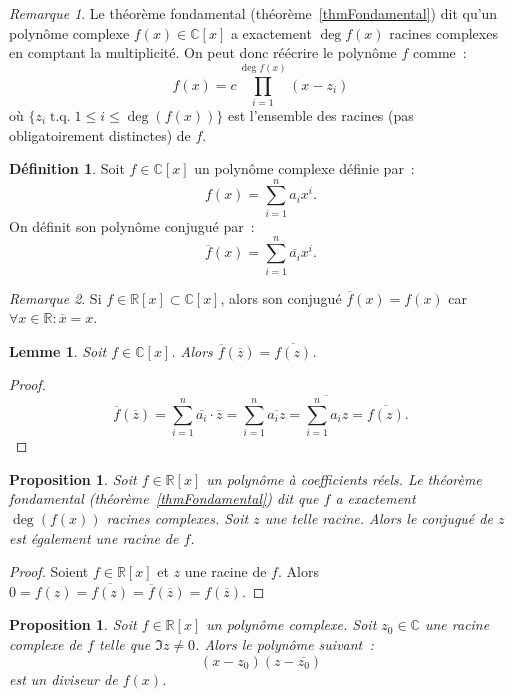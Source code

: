 \documentclass{article}
\DeclareMathOperator{\tq}{\text{ t.q. }}
\newcommand{\R}{\mathbb R}
\newcommand{\C}{\mathbb C}
\newtheorem{prp}[thm]{Proposition}
\newtheorem{lem}[thm]{Lemme}
\theoremstyle{definition}
\newtheorem{déf}[thm]{Définition}
\theoremstyle{remark}
\newtheorem*{rmq}{Remarque}
\begin{document}
		\begin{rmq} Le théorème fondamental (théorème~\ref{thmFondamental}) dit qu'un polynôme complexe $f(x) \in \C[x]$ a exactement $\deg f(x)$ racines complexes en
		comptant la multiplicité. On peut donc réécrire le polynôme $f$ comme~: \[f(x) = c\prod_{i=1}^{\deg f(x)}(x-z_i)\] où $\{z_i \tq 1 \leq i \leq \deg(f(x))\}$ est
		l'ensemble des racines (pas obligatoirement distinctes) de $f$.\end{rmq}

		\begin{déf} Soit $f \in \C[x]$ un polynôme complexe définie par~: \[f(x) = \sum_{i=1}^na_ix^i.\] On définit son polynôme conjugué par~:
		\[\overline f(x) = \sum_{i=1}^n\overline {a_i}x^i.\] \end{déf}

		\begin{rmq} Si $f \in \R[x] \subset \C[x]$, alors son conjugué $\overline f(x) = f(x)$ car $\forall x \in \R : \overline x = x$. \end{rmq}

		\begin{lem} Soit $f \in \C[x]$. Alors $\overline f(\overline z) = \overline {f(z)}$. \end{lem}

		\begin{proof} \[\overline f(\overline z) = \sum_{i=1}^n\overline {a_i}\cdot\overline z = \sum_{i=1}^n\overline {a_iz} = \overline {\sum_{i=1}^na_iz} =
		\overline {f(z)}.\] \end{proof}

		\begin{prp} Soit $f \in \R[x]$ un polynôme à coefficients réels. Le théorème fondamental (théorème~\ref{thmFondamental}) dit que $f$ a exactement $\deg(f(x))$
		racines complexes. Soit $z$ une telle racine. Alors le conjugué de $z$ est également une racine de $f$. \end{prp}

		\begin{proof} Soient $f \in \R[x]$ et $z$ une racine de $f$. Alors $0 = f(z) = \overline {f(z)} = \overline f(\overline z) = f(\overline z)$. \end{proof}

		\begin{prp} Soit $f \in \R[x]$ un polynôme complexe. Soit $z_0 \in \C$ une racine complexe de $f$ telle que $\Im z \neq 0$. Alors le polynôme suivant~:
		\[(x-z_0)(z-\overline {z_0})\] est un diviseur de $f(x)$. \end{prp}
\end{document}
